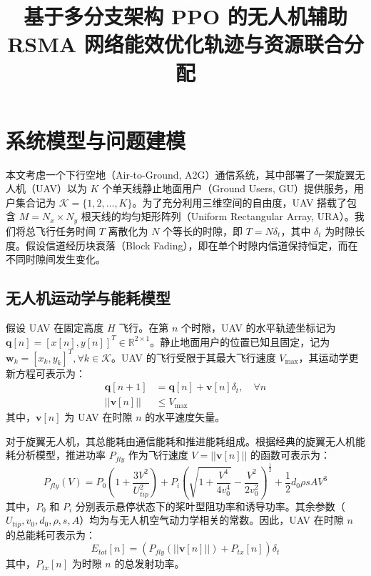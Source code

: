 \documentclass[journal,onecolumn]{IEEEtran}
\begin{document}
	
	\title{基于多分支架构 PPO 的无人机辅助\\ RSMA 网络能效优化轨迹与资源联合分配}
	
	\author{ 
	}
	
	\maketitle
	
	
	
	\section{系统模型与问题建模}
	\label{sec:system_model}
	
	本文考虑一个下行空地（Air-to-Ground, A2G）通信系统，其中部署了一架旋翼无人机（UAV）以为 $K$ 个单天线静止地面用户（Ground Users, GU）提供服务，用户集合记为 $\mathcal{K} = \{1, 2, \dots, K\}$。为了充分利用三维空间的自由度，UAV 搭载了包含 $M = N_x \times N_y$ 根天线的均匀矩形阵列（Uniform Rectangular Array, URA）。我们将总飞行任务时间 $T$ 离散化为 $N$ 个等长的时隙，即 $T = N \delta_t$，其中 $\delta_t$ 为时隙长度。假设信道经历块衰落（Block Fading），即在单个时隙内信道保持恒定，而在不同时隙间发生变化。
	
	\subsection{无人机运动学与能耗模型}
	假设 UAV 在固定高度 $H$ 飞行。在第 $n$ 个时隙，UAV 的水平轨迹坐标记为 $\mathbf{q}[n] = [x[n], y[n]]^T \in \mathbb{R}^{2 \times 1}$。静止地面用户的位置已知且固定，记为 $\mathbf{w}_k = [x_k, y_k]^T, \forall k \in \mathcal{K}$。UAV 的飞行受限于其最大飞行速度 $V_{\max}$，其运动学更新方程可表示为：
	\begin{align}
		\mathbf{q}[n+1] &= \mathbf{q}[n] + \mathbf{v}[n] \delta_t, \quad \forall n \label{eq:kinematics} \\
		||\mathbf{v}[n]|| &\leq V_{\max} \label{eq:v_max}
	\end{align}
	其中，$\mathbf{v}[n]$ 为 UAV 在时隙 $n$ 的水平速度矢量。
	
	对于旋翼无人机，其总能耗由通信能耗和推进能耗组成。根据经典的旋翼无人机能耗分析模型，推进功率 $P_{fly}$ 作为飞行速度 $V = ||\mathbf{v}[n]||$ 的函数可表示为：
	\begin{equation}
		P_{fly}(V) = P_0 \left(1 + \frac{3 V^2}{U_{tip}^2} \right) + P_i \left( \sqrt{1 + \frac{V^4}{4 v_0^4}} - \frac{V^2}{2 v_0^2} \right)^{\frac{1}{2}} + \frac{1}{2} d_0 \rho s A V^3
		\label{eq:propulsion_power}
	\end{equation}
	其中，$P_0$ 和 $P_i$ 分别表示悬停状态下的桨叶型阻功率和诱导功率。其余参数（$U_{tip}, v_0, d_0, \rho, s, A$）均为与无人机空气动力学相关的常数。因此，UAV 在时隙 $n$ 的总能耗可表示为：
	\begin{equation}
		E_{tot}[n] = \left( P_{fly}(||\mathbf{v}[n]||) + P_{tx}[n] \right) \delta_t
		\label{eq:total_energy}
	\end{equation}
	其中，$P_{tx}[n]$ 为时隙 $n$ 的总发射功率。
	
\end{document}
